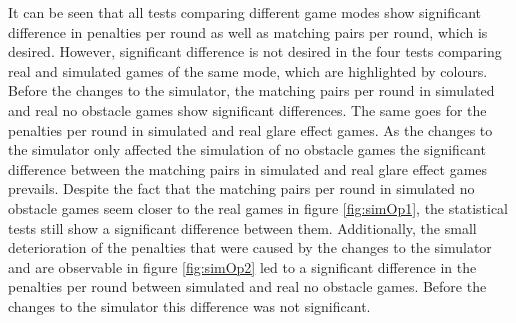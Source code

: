 \newpage

It can be seen that all tests comparing different game modes show significant difference in penalties per round as well as matching pairs per round, which is desired. However, significant difference is not desired in the four tests comparing real and simulated games of the same mode, which are highlighted by colours. Before the changes to the simulator, the matching pairs per round in simulated and real no obstacle games show significant differences. The same goes for the penalties per round in simulated and real glare effect games. As the changes to the simulator only affected the simulation of no obstacle games the significant difference between the matching pairs in simulated and real glare effect games prevails. Despite the fact that the matching pairs per round in simulated no obstacle games seem closer to the real games in figure \ref{fig:simOp1}, the statistical tests still show a significant difference between them. Additionally, the small deterioration of the penalties that were caused by the changes to the simulator and are observable in figure \ref{fig:simOp2} led to a significant difference in the penalties per round between simulated and real no obstacle games. Before the changes to the simulator this difference was not significant.  

